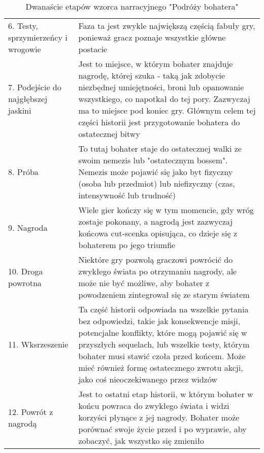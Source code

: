 \begin{table}[h!]
\begin{center}
\begin{tabular}{p{1.5in} p{4in}}
            6. Testy, sprzymierzeńcy i wrogowie & Faza ta jest zwykle największą częścią fabuły gry, ponieważ gracz poznaje wszystkie główne postacie                                                                                                                                                                                                                             \\
            7. Podejście do najgłębszej jaskini & Jest to miejsce, w którym bohater znajduje nagrodę, której szuka - taką jak zdobycie niezbędnej umiejętności, broni lub opanowanie wszystkiego, co napotkał do tej pory. Zazwyczaj ma to miejsce pod koniec gry. Głównym celem tej części historii jest przygotowanie bohatera do ostatecznej bitwy                             \\
            8. Próba                            & To tutaj bohater staje do ostatecznej walki ze swoim nemezis lub "ostatecznym bossem". Nemezis może pojawić się jako byt fizyczny (osoba lub przedmiot) lub niefizyczny (czas, intensywność lub trudność)                                                                                                                       \\
            9. Nagroda                          & Wiele gier kończy się w tym momencie, gdy wróg zostaje pokonany, a nagrodą jest zazwyczaj końcowa cut-scenka opisująca, co dzieje się z bohaterem po jego triumfie                                                                                                                                                              \\
            10. Droga powrotna                  & Niektóre gry pozwolą graczowi powrócić do zwykłego świata po otrzymaniu nagrody, ale może nie być możliwe, aby bohater z powodzeniem zintegrował się ze starym światem                                                                                                                                                          \\
            11. Wksrzeszenie                    & Ta część historii odpowiada na wszelkie pytania bez odpowiedzi, takie jak konsekwencje misji, potencjalne konflikty, które mogą pojawić się w przyszłych sequelach, lub wszelkie testy, którym bohater musi stawić czoła przed końcem. Może mieć również formę ostatecznego zwrotu akcji, jako coś nieoczekiwanego przez widzów \\
            12. Powrót z nagrodą                & Jest to ostatni etap historii, w którym bohater w końcu powraca do zwykłego świata i widzi korzyści płynące z jej nagrody. Bohater może porównać swoje życie przed i po wyprawie, aby zobaczyć, jak wszystko się zmieniło                                                                                                       \\
            \hline
        \end{tabular}
    \end{center}
    \caption{Dwanaście etapów wzorca narracyjnego "Podróży bohatera"\cite{narrative_structures}}\label{tab1:ch1_1}
\end{table}

